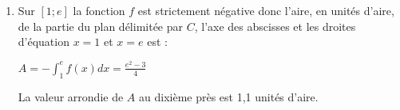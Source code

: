 \begin{corrige}
\begin{enumerate}
\begin{enumerate}[label=\alph*.]
               \item
               Sur $\left[1; e\right]$ la fonction $f$ est strictement négative donc l'aire, en unités d'aire, de la partie du plan délimitée par $C$, l'axe des abscisses et les droites d'équation $x=1$ et $x=e$ est :
               \par
               $A=-\int_{1}^{e}f\left(x\right)dx=\frac{e^{2}-3}{4}$
               \par
               La valeur arrondie de $A$ au dixième près est 1,1 unités d'aire.
          \end{enumerate}
     \end{enumerate}
\end{corrige}
